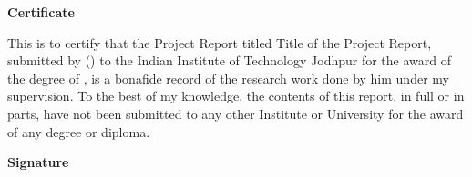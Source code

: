 \myemptypage
\begin{flushright}
\huge{\textbf{Certificate}}
\end{flushright}
This is to certify that the Project Report titled Title of the Project Report, submitted by \authorname{}(\rn{}) to the Indian Institute of Technology Jodhpur for the award of the degree of \degree{}, is a bonafide record of the research work done by him under my supervision. To the best of my knowledge, the contents of this report, in full or in parts, have not been submitted to any other Institute or University for the award of any degree or diploma.
\vspace{2cm}
\begin{flushright}
\large{\textbf{Signature}}\\
\supname\\
\end{flushright}